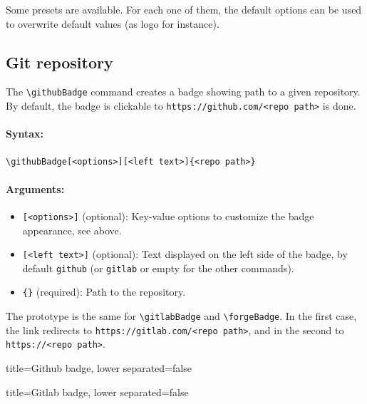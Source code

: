Some presets are available.
For each one of them, the default options can be used to overwrite default values (as logo for instance).

\subsection{Git repository}

The \texttt{\textbackslash githubBadge} command creates a badge showing path to a given repository.
By default, the badge is clickable to \texttt{https://github.com/<repo path>} is done.


\paragraph{Syntax:}
\begin{verbatim}
\githubBadge[<options>][<left text>]{<repo path>}
\end{verbatim}

\paragraph{Arguments:}
\begin{itemize}
    \item \texttt{[<options>]} (optional): Key-value options to customize the badge appearance, see above.
    \item \texttt{[<left text>]} (optional): Text displayed on the left side of the badge, by default \texttt{github} (or \texttt{gitlab} or empty for the other commands).
    \item \texttt{\{<repo path>\}} (required): Path to the repository.
\end{itemize}

The prototype is the same for \texttt{\textbackslash gitlabBadge} and \texttt{\textbackslash forgeBadge}.
In the first case, the link redirects to \texttt{https://gitlab.com/<repo path>},
and in the second to \texttt{https://<repo path>}.


\begin{tcblisting}{title={Github badge}, lower separated=false}
\end{tcblisting}

\begin{tcblisting}{title={Gitlab badge}, lower separated=false}
\end{tcblisting}


